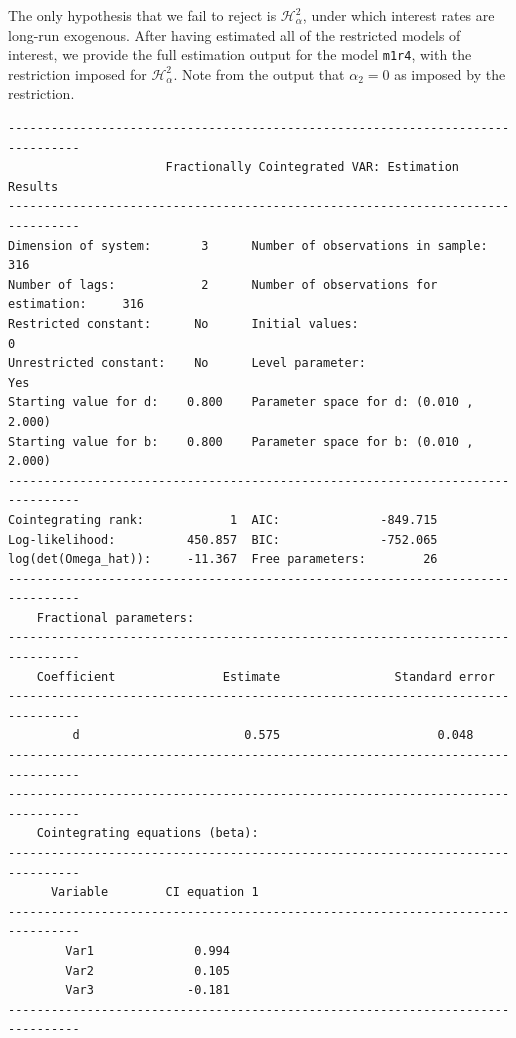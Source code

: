 \documentclass[article]{jss}
\begin{document}
The only hypothesis that we fail to reject is $\mathscr{H}_{\alpha}^2$, under which interest rates are long-run exogenous. 
After having estimated all of the restricted models of interest, we provide the full estimation output for the model \verb|m1r4|, with the restriction imposed for $\mathscr{H}_{\alpha}^2$. 
Note from the output that $\alpha_2 = 0$ as imposed by the restriction.

\begin{verbatim}
--------------------------------------------------------------------------------
                      Fractionally Cointegrated VAR: Estimation Results                              
--------------------------------------------------------------------------------
Dimension of system:       3      Number of observations in sample:          316 
Number of lags:            2      Number of observations for estimation:     316 
Restricted constant:      No      Initial values:                              0
Unrestricted constant:    No      Level parameter:                           Yes
Starting value for d:    0.800    Parameter space for d: (0.010 , 2.000) 
Starting value for b:    0.800    Parameter space for b: (0.010 , 2.000) 
--------------------------------------------------------------------------------
Cointegrating rank:            1  AIC:              -849.715 
Log-likelihood:          450.857  BIC:              -752.065 
log(det(Omega_hat)):     -11.367  Free parameters:        26 
--------------------------------------------------------------------------------
    Fractional parameters:                                                                             
--------------------------------------------------------------------------------
    Coefficient               Estimate                Standard error 
--------------------------------------------------------------------------------
         d                       0.575                      0.048                
--------------------------------------------------------------------------------
--------------------------------------------------------------------------------
    Cointegrating equations (beta):                                                                  
--------------------------------------------------------------------------------
      Variable        CI equation 1  
--------------------------------------------------------------------------------
        Var1              0.994     
        Var2              0.105     
        Var3             -0.181     
--------------------------------------------------------------------------------

\end{verbatim}
\end{document}

